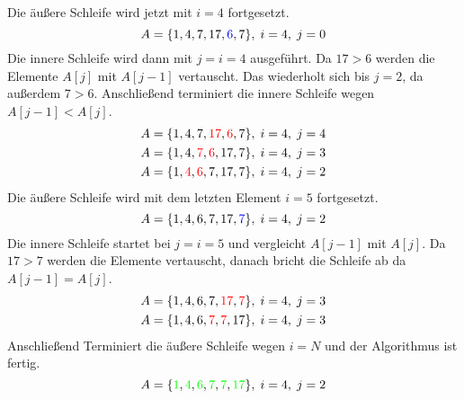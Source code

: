 \noindent
Die äußere Schleife wird jetzt mit $i=4$ fortgesetzt.
\begin{equation*}
	A = \{1,4,7,17,\textcolor{blue}{6},7\},\;i = 4,\;j=0 \\
\end{equation*}
\noindent
Die innere Schleife wird dann mit $j=i=4$ ausgeführt. Da $17 > 6$ werden die Elemente $A[j]$ mit $A[j-1]$ vertauscht. Das wiederholt sich bis $j=2$, da außerdem $7 > 6$. Anschließend terminiert die innere Schleife wegen $A[j-1] < A[j]$.
\begin{equation*}
	\begin{split}
		A = \{1, 4, 7, \textcolor{red}{17}, \textcolor{red}{6}, 7\},\;i = 4,\;j=4 \\
		A = \{1, 4, \textcolor{red}{7}, \textcolor{red}{6}, 17, 7\},\;i = 4,\;j=3 \\
		A = \{1, \textcolor{red}{4}, \textcolor{red}{6}, 7, 17, 7\},\;i = 4,\;j=2 \\
	\end{split}
\end{equation*}
\noindent
Die äußere Schleife wird mit dem letzten Element $i=5$ fortgesetzt.
\begin{equation*}
	A = \{1,4,6,7,17,\textcolor{blue}{7}\},\;i = 4,\;j=2 \\
\end{equation*}
\newpage
\noindent
Die innere Schleife startet bei $j=i=5$ und vergleicht $A[j-1]$ mit $A[j]$. Da $17 > 7$ werden die Elemente vertauscht, danach bricht die Schleife ab da $A[j-1] = A[j]$.
\begin{equation*}
	\begin{split}
		A = \{1,4,6,7,\textcolor{red}{17},\textcolor{red}{7}\},\;i = 4,\;j=3 \\
		A = \{1,4,6,\textcolor{red}{7},\textcolor{red}{7}, 17\},\;i = 4,\;j=3 \\
	\end{split}
\end{equation*}
\noindent
Anschließend Terminiert die äußere Schleife wegen $i = N$ und der Algorithmus ist fertig.
\begin{equation*}
	A = \{\textcolor{green}{1},\textcolor{green}{4},\textcolor{green}{6},\textcolor{green}{7},\textcolor{green}{7},\textcolor{green}{17}\},\;i = 4,\;j=2 \\
\end{equation*}
\newpage